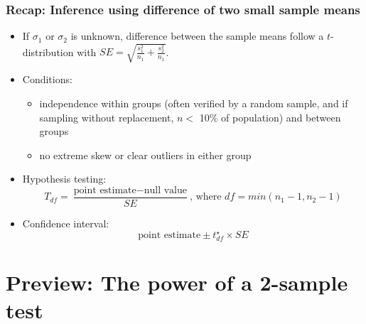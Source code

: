 \documentclass[slidestop,compress,mathserif]{beamer}
\begin{document}
\begin{frame}
\frametitle{Recap: Inference using difference of two small sample means}

\begin{itemize}

\item If $\sigma_1$ or $\sigma_2$ is unknown, difference between the sample means follow a $t$-distribution with $SE = \sqrt{ \frac{s_1^2}{n_1} + \frac{s_2^2}{n_1} }$.

\pause

\item Conditions: 
\begin{itemize}
\item independence within groups (often verified by a random sample, and if sampling without replacement, $n < $ 10\% of population) and between groups
\item no extreme skew or clear outliers in either group
\end{itemize}

\pause

\item Hypothesis testing: 
\[ T_{df} = \frac{\text{point estimate} - \text{null value}}{SE}\text{, where }df = min(n_1 - 1, n_2 - 1) \]

\pause

\item Confidence interval:
\[ \text{point estimate} \pm t_{df}^\star \times SE \]

\end{itemize}

\end{frame}


\section{Preview: The power of a 2-sample test}

\end{document}
